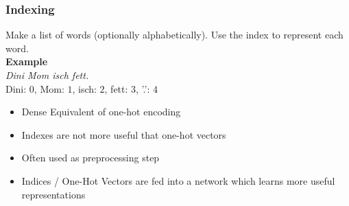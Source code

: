 \subsubsection{Indexing}
Make a list of words (optionally alphabetically). Use the index to represent each word.\\
\textbf{Example}\\
\textit{Dini Mom isch fett.}\\
Dini: $0$, Mom: $1$, isch: $2$, fett: $3$, '.': $4$
\begin{itemize}
    \item Dense Equivalent of one-hot encoding
    \item Indexes are not more useful that one-hot vectors
    \item Often used as preprocessing step
    \item Indices / One-Hot Vectors are fed into a network which learns more useful representations
\end{itemize}

